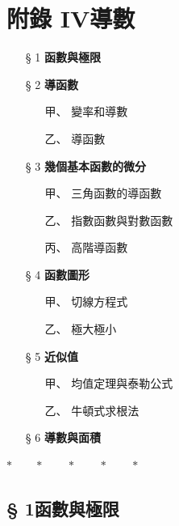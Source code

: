 \section*{附錄 IV\quad 導數}\label{sec:b6s-app4}
\resetsectcounters

\begin{itemize}[leftmargin=3em, itemsep=0.2em]
  \item[§ 1] \textbf{函數與極限}
  \item[§ 2] \textbf{導函數}
  \begin{itemize}[leftmargin=2em, itemsep=0.1em]
    \item[甲、] 變率和導數
    \item[乙、] 導函數
  \end{itemize}
  \item[§ 3] \textbf{幾個基本函數的微分}
  \begin{itemize}[leftmargin=2em, itemsep=0.1em]
    \item[甲、] 三角函數的導函數
    \item[乙、] 指數函數與對數函數
    \item[丙、] 高階導函數
  \end{itemize}
  \item[§ 4] \textbf{函數圖形}
  \begin{itemize}[leftmargin=2em, itemsep=0.1em]
    \item[甲、] 切線方程式
    \item[乙、] 極大極小
  \end{itemize}
  \item[§ 5] \textbf{近似值}
  \begin{itemize}[leftmargin=2em, itemsep=0.1em]
    \item[甲、] 均值定理與泰勒公式
    \item[乙、] 牛頓式求根法
  \end{itemize}
  \item[§ 6] \textbf{導數與面積}
\end{itemize}

\begin{center}
$* \qquad * \qquad * \qquad * \qquad *$
\end{center}

\subsection*{§ 1\quad 函數與極限}\label{subsec:b6s-app4-1}

